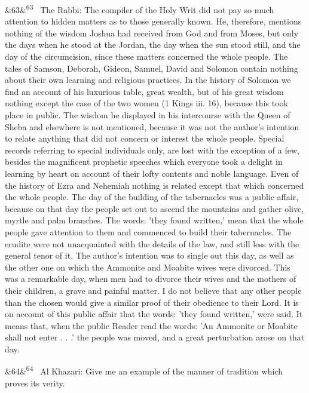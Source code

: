 \documentclass[12pt]{article}
\newcommand{\para}[1][]{\par\noindent\ifx&#1&\else\textsuperscript{\footnotesize #1}~\fi}
\begin{document}
\para[63] The Rabbi: The compiler of the Holy Writ did not pay so much attention to hidden matters as to those generally known. He, therefore, mentions nothing of the wisdom Joshua had received from God and from Moses, but only the days when he stood at the Jordan, the day when the sun stood still, and the day of the circumcision, since these matters concerned the whole people. The tales of Samson, Deborah, Gideon, Samuel, David and Solomon contain nothing about their own learning and religious practices. In the history of Solomon we find an account of his luxurious table, great wealth, but of his great wisdom nothing except the case of the two women (1 Kings iii. 16), because this took place in public. The wisdom he displayed in his intercourse with the Queen of Sheba and elsewhere is not mentioned, because it was not the author's intention to relate anything that did not concern or interest the whole people. Special records referring to special individuals only, are lost with the exception of a few, besides the magnificent prophetic speeches which everyone took a delight in learning by heart on account of their lofty contents and noble language. Even of the history of Ezra and Nehemiah nothing is related except that which concerned the whole people. The day of the building of the tabernacles was a public affair, because on that day the people set out to ascend the mountains and gather olive, myrtle and palm branches. The words: 'they found written,' mean that the whole people gave attention to them and commenced to build their tabernacles. The erudite were not unacquainted with the details of the law, and still less with the general tenor of it. The author's intention was to single out this day, as well as the other one on which the Ammonite and Moabite wives were divorced. This was a remarkable day, when men had to divorce their wives and the mothers of their children, a grave and painful matter. I do not believe that any other people than the chosen would give a similar proof of their obedience to their Lord. It is on account of this public affair that the words: 'they found written,' were said. It means that, when the public Reader read the words: 'An Ammonite or Moabite shall not enter . . .' the people was moved, and a great perturbation arose on that day.

\para[64] Al Khazari: Give me an example of the manner of tradition which proves its verity.
\end{document}
